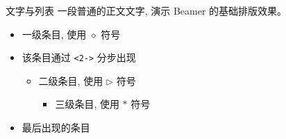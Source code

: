
\begin{frame}{文字与列表}
  一段普通的正文文字, 演示 Beamer 的基础排版效果。

  \begin{itemize}
    \item 一级条目, 使用 $\diamond$ 符号
    \item<2-> 该条目通过 \texttt{<2->} 分步出现
    \begin{itemize}
      \item 二级条目, 使用 $\triangleright$ 符号
      \begin{itemize}
        \item 三级条目, 使用 $\ast$ 符号
      \end{itemize}
    \end{itemize}
    \item<3-> 最后出现的条目
  \end{itemize}
\end{frame}
